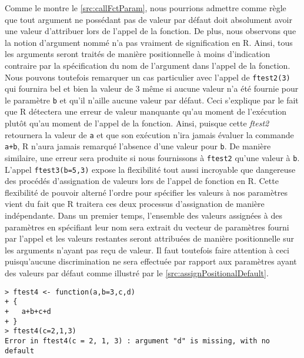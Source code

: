 \vspace{\baselineskip}
\noindent
Comme le montre le \autoref{src:callFctParam}, nous pourrions admettre comme règle que tout argument ne possédant pas de valeur par défaut doit absolument avoir une valeur d'attribuer lors de l'appel de la fonction. De plus, nous observons que la notion d'argument nommé n'a pas vraiment de signification en R. Ainsi, tous les arguments seront traités de manière positionnelle à moins d'indication contraire par la spécification du nom de l'argument dans l'appel de la fonction. Nous pouvons toutefois remarquer un cas particulier avec l'appel de \texttt{ftest2(3)} qui fournira bel et bien la valeur de 3 même si aucune valeur n'a été fournie pour le paramètre \texttt{b} et qu'il n'aille aucune valeur par défaut. Ceci s'explique par le fait que R détectera une erreur de valeur manquante qu'au moment de l'exécution plutôt qu'au moment de l'appel de la fonction. Ainsi, puisque cette \emph{ftest2} retournera la valeur de \texttt{a} et que son exécution n'ira jamais évaluer la commande \texttt{a+b}, R n'aura jamais remarqué l'absence d'une valeur pour \texttt{b}. De manière similaire, une erreur sera produite si nous fournissons à \texttt{ftest2} qu'une valeur à \texttt{b}. L'appel \texttt{ftest3(b=5,3)} expose la flexibilité tout aussi incroyable que dangereuse des procédés d'assignation de valeurs lors de l'appel de fonction en R. Cette flexibilité de pouvoir alterné l'ordre pour spécifier les valeurs à nos paramètres vient du fait que R traitera ces deux processus d'assignation de manière indépendante. Dans un premier temps, l'ensemble des valeurs assignées à des paramètres en spécifiant leur nom sera extrait du vecteur de paramètres fourni par l'appel et les valeurs restantes seront attribuées de manière positionnelle sur les arguments n'ayant pas reçu de valeur. Il faut toutefois faire attention à ceci puisqu’aucune discrimination ne sera effectuée par rapport aux paramètres ayant des valeurs par défaut comme illustré par le \autoref{src:assignPositionalDefault}.

\begin{lstlisting}[caption = L'assignation et les valeurs par défaut,label=src:assignPositionalDefault]
> ftest4 <- function(a,b=3,c,d)
+ {
+   a+b+c+d
+ }
> ftest4(c=2,1,3)
Error in ftest4(c = 2, 1, 3) : argument "d" is missing, with no default
\end{lstlisting}

